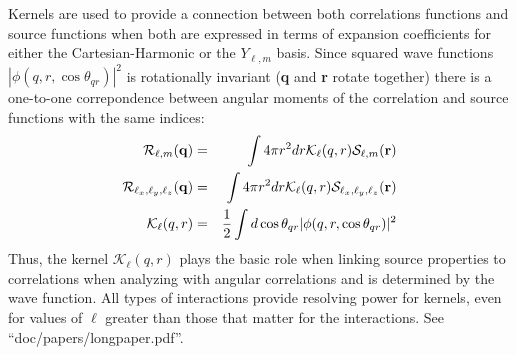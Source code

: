 \documentclass[10pt]{article}
\begin{document}
Kernels are used to provide a connection between both correlations functions and source functions when both are expressed in terms of expansion coefficients for either the Cartesian-Harmonic or the $Y_{\ell,m}$ basis. Since squared wave functions $|\phi(q,r,\cos\theta_{qr})|^2$ is rotationally invariant ({\bf q} and {\bf r} rotate together) there is a one-to-one correpondence between angular moments of the correlation and source functions with the same indices:
\begin{eqnarray}
{\mathcal R}_{\ell,m}({\bf q})&=&\int 4\pi r^2dr 
{\mathcal K}_\ell(q,r) {\mathcal S}_{\ell,m}({\bf r})\\
{\mathcal R}_{\ell_x,\ell_y,\ell_z}({\bf q})&=&\int 4\pi r^2dr 
{\mathcal K}_{\ell}(q,r) {\mathcal S}_{\ell_x,\ell_y,\ell_z}({\bf r})\\
{\mathcal K}_{\ell}(q,r)&=&\frac{1}{2}\int d\cos\theta_{qr}
|\phi(q,r,\cos\theta_{qr})|^2
\end{eqnarray}
Thus, the kernel ${\mathcal K}_\ell(q,r)$ plays the basic role when linking source properties to correlations when analyzing with angular correlations and is determined by the wave function. All types of interactions provide resolving power for kernels, even for values of $\ell$ greater than those that matter for the interactions. See ``doc/papers/longpaper.pdf''.
\end{document}
